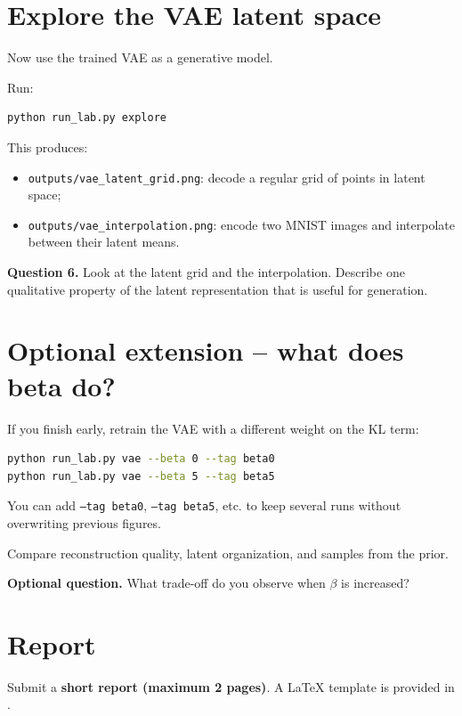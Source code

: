 \documentclass[11pt,a4paper]{article}
\newcommand{\question}[2]{%
  \vspace{0.4em}
  \noindent\textbf{Question #1.} #2
  \vspace{0.5em}
}
\begin{document}
\section{Explore the VAE latent space}

Now use the trained VAE as a generative model.

Run:

\begin{lstlisting}[language=bash]
python run_lab.py explore
\end{lstlisting}

This produces:
\begin{itemize}
  \item \texttt{outputs/vae\_latent\_grid.png}: decode a regular grid of points in latent space;
  \item \texttt{outputs/vae\_interpolation.png}: encode two MNIST images and interpolate between their latent means.
\end{itemize}

\question{6}{Look at the latent grid and the interpolation. Describe one qualitative property of the latent representation that is useful for generation.}

\section{Optional extension -- what does beta do?}

If you finish early, retrain the VAE with a different weight on the KL term:

\begin{lstlisting}[language=bash]
python run_lab.py vae --beta 0 --tag beta0
python run_lab.py vae --beta 5 --tag beta5
\end{lstlisting}

You can add \texttt{--tag beta0}, \texttt{--tag beta5}, etc. to keep several runs without overwriting previous figures.

Compare reconstruction quality, latent organization, and samples from the prior.

\noindent\textbf{Optional question.} What trade-off do you observe when $\beta$ is increased?

\section{Report}

Submit a \textbf{short report (maximum 2 pages)}. A LaTeX template is provided in .
\end{document}
